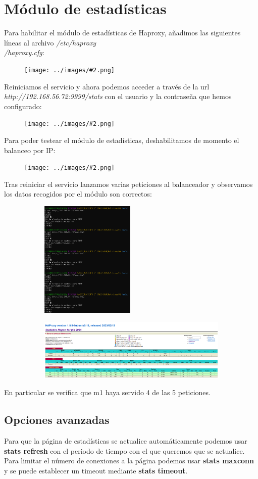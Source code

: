 \documentclass[twoside]{article}
\newcommand{\image}[2]{
\begin{figure}[H]
    \texttt{[image: ../images/\#2.png]}
    \centering
\end{figure}
}
\begin{document}
\section{Módulo de estadísticas}
Para habilitar el módulo de estadísticas de Haproxy, añadimos las siguientes líneas al archivo \textit{/etc/haproxy\\/haproxy.cfg}:
\image{8}{23}
Reiniciamos el servicio y ahora podemos acceder a través de la url \textit{http://192.168.56.72:9999/stats} con el usuario y la contraseña que hemos configurado:
\image{10}{24}
Para poder testear el módulo de estadísticas, deshabilitamos de momento el balanceo por IP:
\image{8}{25}
Tras reiniciar el servicio lanzamos varias peticiones al balanceador y observamos los datos recogidos por el módulo son correctos:
\begin{figure}[H]
    \centering
    \begin{subfigure}{.3\textwidth}
        \centering
        \includegraphics[width=4.5cm]{../images/26.png}
    \end{subfigure}%
    \begin{subfigure}{.7\textwidth}
        \centering
        \includegraphics[width=10.5cm]{../images/27.png}
    \end{subfigure}
\end{figure}
En particular se verifica que m1 haya servido 4 de las 5 peticiones.
\subsection{Opciones avanzadas}
Para que la página de estadísticas se actualice automáticamente podemos usar \textbf{stats refresh} con el periodo de tiempo con el que queremos que se actualice. Para limitar el número de conexiones a la página podemos usar \textbf{stats maxconn} y se puede establecer un timeout mediante \textbf{stats timeout}. 
\end{document}
